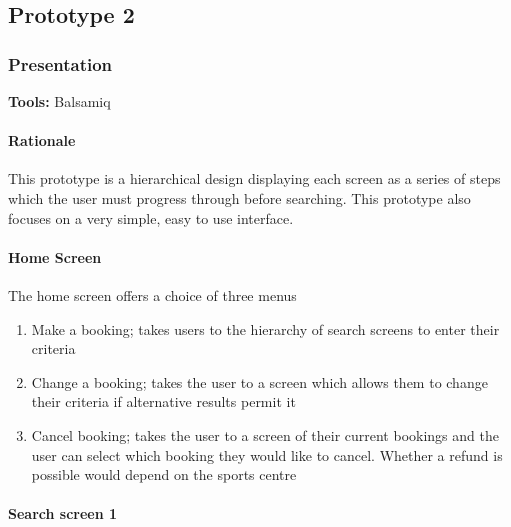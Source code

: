 \subsection{Prototype 2}

\subsubsection{Presentation}
\textbf{Tools:} Balsamiq

\paragraph{Rationale}
This prototype is a hierarchical design displaying each screen as a series of
steps which the user must progress through before searching. This prototype
also focuses on a very simple, easy to use interface.

\paragraph{Home Screen}

The home screen offers a choice of three menus

\begin{enumerate}
	\item Make a booking; takes users to the hierarchy of search screens to
		enter their criteria
	\item Change a booking; takes the user to a screen which allows them to
		change their criteria if alternative results permit it
	\item Cancel booking; takes the user to a screen of their current bookings
		and the user can select which booking they would like to cancel.
		Whether a refund is possible would depend on the sports centre
\end{enumerate}

\paragraph{Search screen 1}

